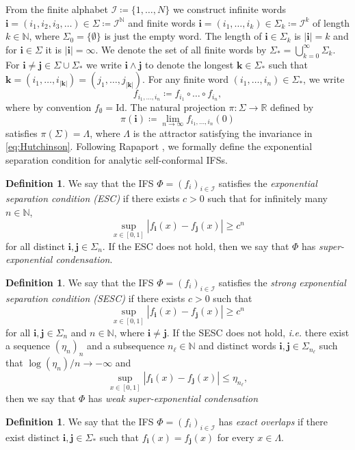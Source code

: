 \documentclass[11pt,]{article}
\def\cref#1{\ref{#1}}%
\theoremstyle{definition}
\newtheorem{definition}[theorem]{Definition}
\theoremstyle{remark}
\renewcommand{\Bbb}[1]{\mathbb{#1}}
\newcommand{\bbN}{{\Bbb N}}         %
\newcommand{\bbR}{{\Bbb R}}        %
\newcommand{\0}{\mathbf{0}}
\newcommand{\ie}{{\it i.e.}\/ }
\newcommand{\bi}{\mathbf{i}}
\newcommand{\bj}{\mathbf{j}}
\begin{document}
From the finite alphabet $\mathcal{I}\coloneqq\{1,\ldots,N\}$ we construct infinite words
$\bi=(i_1,i_2,i_3,\dots) \in\Sigma \coloneqq \mathcal{I}^{\bbN}$ and finite words
$\bi=(i_1,\ldots,i_k)\in \Sigma_k\coloneqq \mathcal{I}^k$ of length $k\in\mathbb{N}$, where
$\Sigma_0=\{\emptyset\}$ is just the empty word. The length of $\bi\in\Sigma_k$ is $|\bi|=k$ and for
$\bi\in\Sigma$ it is $|\bi|=\infty$. We denote the set of all finite words by $\Sigma_* =
\bigcup_{k=0}^\infty \Sigma_k$. For $\bi\neq\bj\in\Sigma\cup\Sigma_*$ we write $\bi\wedge\bj$
to denote the longest $\mathbf{k}\in\Sigma_*$ such that $\mathbf{k} = (i_1,\dots,
i_{|\mathbf{k}|})=(j_1,\dots,j_{|\mathbf{k}|})$.
For any finite word $(i_1,\dots,i_n)\in\Sigma_*$, we write
\[
f_{i_1,\dots,i_n}\coloneqq f_{i_1}\circ \dots \circ f_{i_n},
\]
where by convention $f_{\emptyset}=\mathrm{Id}$. The natural projection $\pi\colon\Sigma\to\bbR$ defined by
\begin{equation}\label{eq:natProj}
\pi(\bi)\coloneqq\lim_{n\to\infty}f_{i_1,\dots,i_n}(0)
\end{equation}
satisfies $\pi(\Sigma)=\Lambda$, where $\Lambda$ is the attractor satisfying the invariance in
\cref{eq:Hutchinson}. 
Following Rapaport \cite{Rapaport_SelfConfESC25arXiv}, we formally define the exponential separation
condition for analytic self-conformal IFSs.
\begin{definition}
  We say that the IFS $\Phi=(f_i)_{i\in\mathcal{I}}$ 
  satisfies the \emph{exponential separation condition (ESC)} if there exists $c>0$ such that for
  infinitely many $n\in\mathbb{N}$,
  \[
    \sup_{x\in[0,1]} |f_{\bi}(x)-f_{\bj}(x)| \geq c^n
  \]
  for all distinct $\bi,\bj\in\Sigma_n$. If the ESC does not hold,
  then we say that $\Phi$ has \emph{super-exponential condensation}.	
\end{definition}
\begin{definition}\label{def:SESC}
  We say that the IFS $\Phi=(f_i)_{i\in\mathcal{I}}$ 
  satisfies the \emph{strong exponential separation condition (SESC)} if there exists $c>0$ such that
  \[
    \sup_{x\in[0,1]} |f_{\bi}(x)-f_{\bj}(x)| \geq c^n
  \]
  for all $\bi,\bj\in\Sigma_n$ and $n\in\bbN$, where $\bi\neq\bj$. 
  If the SESC does not hold, \ie there exist a sequence $(\eta_n)_n$ and a subsequence
  $n_{\ell}\in\bbN$ and distinct words $\bi,\bj\in\Sigma_{n_\ell}$ such that
  $\log(\eta_n)/n\to-\infty$ and
  \[
    \sup_{x\in[0,1]}|f_{\bi}(x)-f_{\bj}(x)| \leq \eta_{n_\ell},
  \]
  then we say that $\Phi$ has \emph{weak super-exponential condensation}
\end{definition}
\begin{definition}
  We say that the IFS $\Phi=(f_i)_{i\in\mathcal{I}}$ 
 has \emph{exact overlaps} if there exist distinct $\bi,\bj\in\Sigma_*$ such that
 $f_{\bi}(x)=f_{\bj}(x)$ for every $x\in\Lambda$. 
\end{definition}
\end{document}
